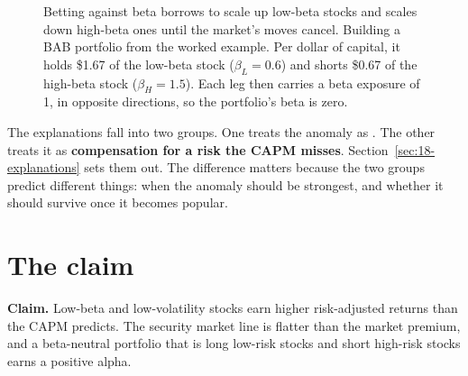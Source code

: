 \begin{figure}[htbp]
\centering
{}
\caption{Betting against beta borrows to scale up low-beta stocks and scales down high-beta ones until the market's moves cancel. Building a BAB portfolio from the worked example. Per dollar of capital, it holds \$1.67 of the low-beta stock ($\beta_L = 0.6$) and shorts \$0.67 of the high-beta stock ($\beta_H = 1.5$). Each leg then carries a beta exposure of 1, in opposite directions, so the portfolio's beta is zero.}
\label{fig:18-bab}
\end{figure}

The explanations fall into two groups. One treats the anomaly as . The other treats it as \textbf{compensation for a risk the CAPM misses}. Section~\ref{sec:18-explanations} sets them out. The difference matters because the two groups predict different things: when the anomaly should be strongest, and whether it should survive once it becomes popular.

\section{The claim}
\label{sec:18-claim}

\begin{callout}
\textbf{Claim.} Low-beta and low-volatility stocks earn higher risk-adjusted returns than the CAPM predicts. The security market line is flatter than the market premium, and a beta-neutral portfolio that is long low-risk stocks and short high-risk stocks earns a positive alpha.
\end{callout}

